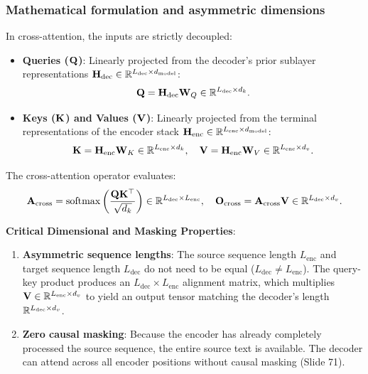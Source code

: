 \documentclass[../../main.tex]{subfiles}
\begin{document}
\subsubsection{Mathematical formulation and asymmetric dimensions}
In cross-attention, the inputs are strictly decoupled:
\begin{itemize}
    \item \textbf{Queries ($\mathbf{Q}$)}: Linearly projected from the decoder's prior sublayer representations $\mathbf{H}_{\text{dec}} \in \mathbb{R}^{L_{\text{dec}} \times d_{\text{model}}}$:
    \begin{equation}
    \mathbf{Q} = \mathbf{H}_{\text{dec}} \mathbf{W}_Q \in \mathbb{R}^{L_{\text{dec}} \times d_k}.
    \end{equation}
    \item \textbf{Keys ($\mathbf{K}$) and Values ($\mathbf{V}$)}: Linearly projected from the terminal representations of the encoder stack $\mathbf{H}_{\text{enc}} \in \mathbb{R}^{L_{\text{enc}} \times d_{\text{model}}}$:
    \begin{equation}
    \mathbf{K} = \mathbf{H}_{\text{enc}} \mathbf{W}_K \in \mathbb{R}^{L_{\text{enc}} \times d_k}, \quad \mathbf{V} = \mathbf{H}_{\text{enc}} \mathbf{W}_V \in \mathbb{R}^{L_{\text{enc}} \times d_v}.
    \end{equation}
\end{itemize}
The cross-attention operator evaluates:
\begin{equation}
\label{eq:cross_attention_formula_ch5}
\mathbf{A}_{\text{cross}} = \operatorname{\mathrm{softmax}}\left( \frac{\mathbf{Q} \mathbf{K}^\top}{\sqrt{d_k}} \right) \in \mathbb{R}^{L_{\text{dec}} \times L_{\text{enc}}}, \quad \mathbf{O}_{\text{cross}} = \mathbf{A}_{\text{cross}} \mathbf{V} \in \mathbb{R}^{L_{\text{dec}} \times d_v}.
\end{equation}

\noindent\textbf{Critical Dimensional and Masking Properties}:
\begin{enumerate}
    \item \textbf{Asymmetric sequence lengths}: The source sequence length $L_{\text{enc}}$ and target sequence length $L_{\text{dec}}$ do not need to be equal ($L_{\text{dec}} \neq L_{\text{enc}}$). The query-key product produces an $L_{\text{dec}} \times L_{\text{enc}}$ alignment matrix, which multiplies $\mathbf{V} \in \mathbb{R}^{L_{\text{enc}} \times d_v}$ to yield an output tensor matching the decoder's length $\mathbb{R}^{L_{\text{dec}} \times d_v}$.
    \item \textbf{Zero causal masking}: Because the encoder has already completely processed the source sequence, the entire source text is available. The decoder can attend across all encoder positions without causal masking (Slide 71).
\end{enumerate}
\end{document}
